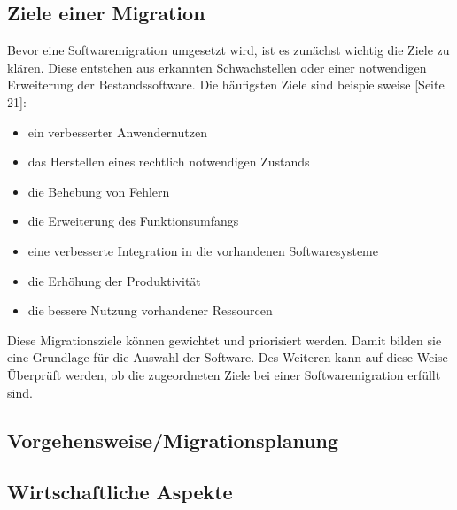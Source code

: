 \subsection{Ziele einer Migration}
Bevor eine Softwaremigration umgesetzt wird, ist es zunächst wichtig die Ziele zu klären. Diese entstehen aus erkannten Schwachstellen oder einer notwendigen Erweiterung der Bestandssoftware. Die häufigsten Ziele sind beispielsweise \cite{BUND12}[Seite 21]:
\begin{itemize}
  \item ein verbesserter Anwendernutzen
  \item das Herstellen eines rechtlich notwendigen Zustands
  \item die Behebung von Fehlern
  \item die Erweiterung des Funktionsumfangs
  \item eine verbesserte Integration in die vorhandenen Softwaresysteme
  \item die Erhöhung der Produktivität
  \item die bessere Nutzung vorhandener Ressourcen
\end{itemize}
Diese Migrationsziele können gewichtet und priorisiert werden. Damit bilden sie eine Grundlage für die Auswahl der Software. Des Weiteren kann auf diese Weise Überprüft werden, ob die zugeordneten Ziele bei einer Softwaremigration erfüllt sind.
\subsection{Vorgehensweise/Migrationsplanung}
\subsection{Wirtschaftliche Aspekte}
